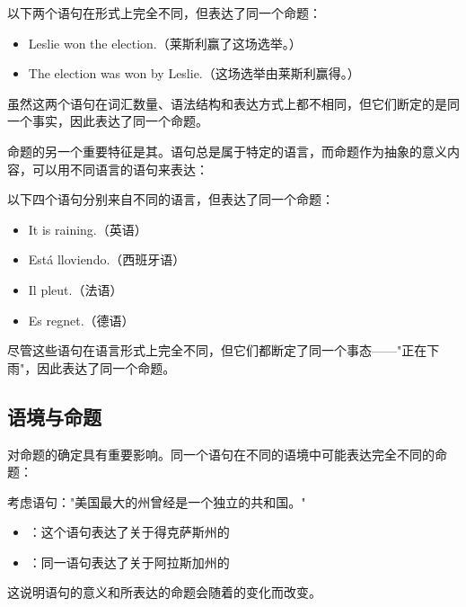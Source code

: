\begin{examplebox}[title=同一命题的不同表达]
以下两个语句在形式上完全不同，但表达了同一个命题：
\begin{itemize}
  \item Leslie won the election.（莱斯利赢了这场选举。）
  \item The election was won by Leslie.（这场选举由莱斯利赢得。）
\end{itemize}

虽然这两个语句在词汇数量、语法结构和表达方式上都不相同，但它们断定的是同一个事实，因此表达了同一个命题。
\end{examplebox}

命题的另一个重要特征是其。语句总是属于特定的语言，而命题作为抽象的意义内容，可以用不同语言的语句来表达：

\begin{examplebox}[title=跨语言的命题表达]
以下四个语句分别来自不同的语言，但表达了同一个命题：
\begin{itemize}
  \item It is raining.（英语）
  \item Está lloviendo.（西班牙语）
  \item Il pleut.（法语）
  \item Es regnet.（德语）
\end{itemize}

尽管这些语句在语言形式上完全不同，但它们都断定了同一个事态——"正在下雨"，因此表达了同一个命题。
\end{examplebox}

\subsection{语境与命题}

对命题的确定具有重要影响。同一个语句在不同的语境中可能表达完全不同的命题：

\begin{examplebox}[title=语境对命题的影响]
考虑语句："美国最大的州曾经是一个独立的共和国。"

\begin{itemize}
  \item {}：这个语句表达了关于得克萨斯州的
  \item {}：同一语句表达了关于阿拉斯加州的
\end{itemize}

这说明语句的意义和所表达的命题会随着的变化而改变。
\end{examplebox}

